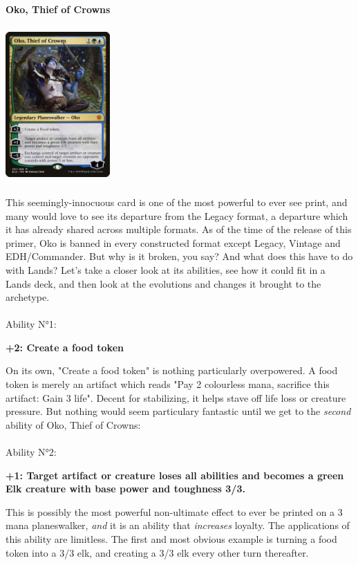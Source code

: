 \documentclass{report}
\begin{document}
\newpage
\textbf{Oko, Thief of Crowns\\}
\begin{center}
\includegraphics [width = 4cm, height = 6cm] {oko-thief-of-crowns}
\end{center}
This seemingly-innocuous card is one of the most powerful to ever see print, and many would love to see its departure from the Legacy format, a departure which it has already shared across multiple formats. As of the time of the release of this primer, Oko is banned in every constructed format except Legacy, Vintage and EDH/Commander. But why is it broken, you say? And what does this have to do with Lands?
Let's take a closer look at its abilities, see how it could fit in a Lands deck, and then look at the evolutions and changes it brought to the archetype.\\\\
Ability N°1:\\
\begin{center}
\textbf{+2: Create a food token}
\end{center}
On its own, "Create a food token" is nothing particularly overpowered. A food token is merely an artifact which reads "Pay 2 colourless mana, sacrifice this artifact: Gain 3 life". Decent for stabilizing, it helps stave off life loss or creature pressure. But nothing would seem particulary fantastic until we get to the \emph{second} ability of Oko, Thief of Crowns:\\\\
Ability N°2:\\
\begin{center}
\textbf{+1: Target artifact or creature loses all abilities and becomes a green Elk creature with base power and toughness 3/3.}
\end{center}
This is possibly the most powerful non-ultimate effect to ever be printed on a 3 mana planeswalker, \emph{and} it is an ability that \emph{increases} loyalty. The applications of this ability are limitless. The first and most obvious example is turning a food token into a 3/3 elk, and creating a 3/3 elk every other turn thereafter.\\
\end{document}
